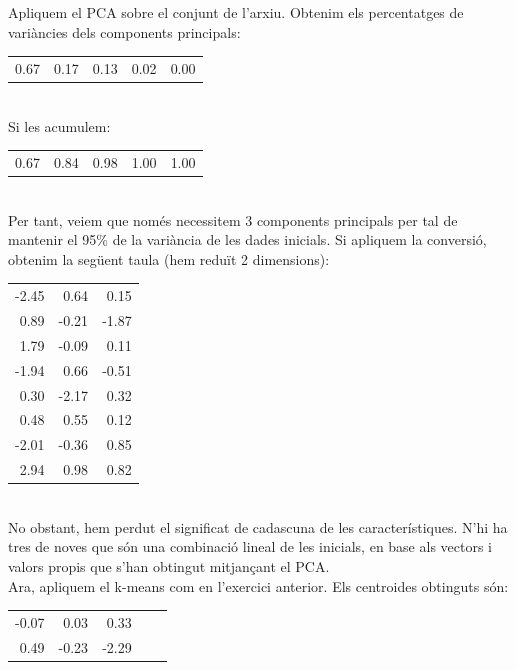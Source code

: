 \documentclass{article} %
\begin{document}
{\color{blue} \leftmargin=4in
	Apliquem el PCA sobre el conjunt de l'arxiu. Obtenim els percentatges de variàncies dels components principals: \\

	{\selectfont\small
	\begin{tabular}{r r r r r}
		0.67 & 0.17 & 0.13 & 0.02 & 0.00 \\
	\end{tabular}
	} \\

	Si les acumulem: \\

	{\selectfont\small
	\begin{tabular}{r r r r r}
		0.67 & 0.84 & 0.98 & 1.00 & 1.00 \\
	\end{tabular}
	} \\

	Per tant, veiem que només necessitem 3 components principals per tal de mantenir el 95\% de la variància de les dades inicials. Si apliquem la conversió, obtenim la següent taula (hem reduït 2 dimensions): \\

	{\selectfont\small
	\begin{tabular}{r r r}
		-2.45 &  0.64 &  0.15 \\
		 0.89 & -0.21 & -1.87 \\
		 1.79 & -0.09 &  0.11 \\
		-1.94 &  0.66 & -0.51 \\
		 0.30 & -2.17 &  0.32 \\
		 0.48 &  0.55 &  0.12 \\
		-2.01 & -0.36 &  0.85 \\
		 2.94 &  0.98 &  0.82 \\
	\end{tabular}
	} \\

	No obstant, hem perdut el significat de cadascuna de les característiques. N'hi ha tres de noves que són una combinació lineal de les inicials, en base als vectors i valors propis que s'han obtingut mitjançant el PCA. \\

	Ara, apliquem el k-means com en l’exercici anterior. Els centroides obtinguts són: \\

	{\selectfont\small
	\begin{tabular}{r r r r r}
		-0.07 &  0.03 &  0.33 \\
		 0.49 & -0.23 & -2.29 \\
	\end{tabular}
	} \\

}
\end{document}
